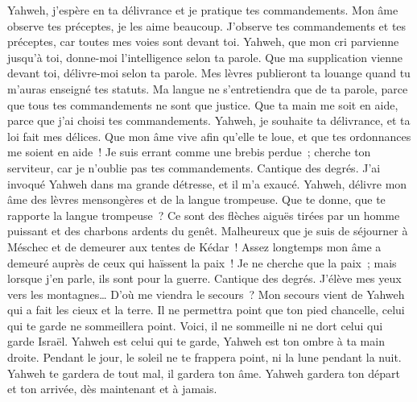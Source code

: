 \begin{multicols}{2}
Yahweh, j'espère en ta délivrance et je pratique tes commandements.
Mon âme observe tes préceptes, je les aime beaucoup.
J'observe tes commandements et tes préceptes, car toutes mes voies sont devant toi.
 Yahweh, que mon cri parvienne jusqu'à toi, donne-moi l'intelligence selon ta parole.
Que ma supplication vienne devant toi, délivre-moi selon ta parole.
Mes lèvres publieront ta louange quand tu m'auras enseigné tes statuts.
Ma langue ne s'entretiendra que de ta parole, parce que tous tes commandements ne sont que justice.
Que ta main me soit en aide, parce que j'ai choisi tes commandements.
Yahweh, je souhaite ta délivrance, et ta loi fait mes délices.
Que mon âme vive afin qu'elle te loue, et que tes ordonnances me soient en aide~!
Je suis errant comme une brebis perdue~; cherche ton serviteur, car je n'oublie pas tes commandements.
\VerseOne{}Cantique des degrés. J'ai invoqué Yahweh dans ma grande détresse, et il m'a exaucé.
Yahweh, délivre mon âme des lèvres mensongères et de la langue trompeuse.
Que te donne, que te rapporte la langue trompeuse~?
Ce sont des flèches aiguës tirées par un homme puissant et des charbons ardents du genêt.
Malheureux que je suis de séjourner à Méschec et de demeurer aux tentes de Kédar~!
Assez longtemps mon âme a demeuré auprès de ceux qui haïssent la paix~!
Je ne cherche que la paix~; mais lorsque j'en parle, ils sont pour la guerre.
\VerseOne{}Cantique des degrés. J'élève mes yeux vers les montagnes… D'où me viendra le secours~?
Mon secours vient de Yahweh qui a fait les cieux et la terre.
Il ne permettra point que ton pied chancelle, celui qui te garde ne sommeillera point.
Voici, il ne sommeille ni ne dort celui qui garde Israël.
Yahweh est celui qui te garde, Yahweh est ton ombre à ta main droite.
Pendant le jour, le soleil ne te frappera point, ni la lune pendant la nuit.
Yahweh te gardera de tout mal, il gardera ton âme.
Yahweh gardera ton départ et ton arrivée, dès maintenant et à jamais.

\end{multicols}
